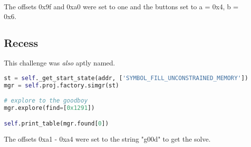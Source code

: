 \noindent The offsets 0x9f and 0xa0 were set to one and the buttons set to a = 0x4, b = 0x6.

\subsection{Recess}
This challenge was \emph{also} aptly named.

\begin{lstlisting}[language=python]
st = self._get_start_state(addr, ['SYMBOL_FILL_UNCONSTRAINED_MEMORY'])⋅
mgr = self.proj.factory.simgr(st)

# explore to the goodboy
mgr.explore(find=[0x1291])

self.print_table(mgr.found[0])
\end{lstlisting}

\noindent The offsets 0xa1 - 0xa4 were set to the string "g00d" to get the solve.
